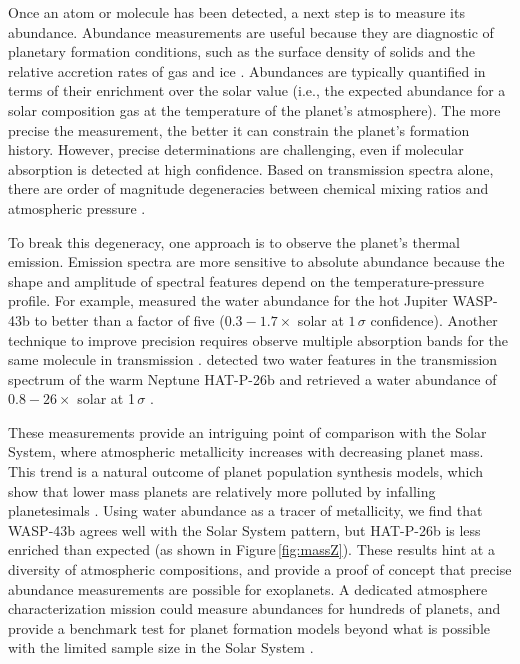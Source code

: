 \documentclass[graybox,natbib,nosecnum]{svmult}
\begin{document}
Once an atom or molecule has been detected, a next step is to measure its abundance. Abundance measurements are useful because they are diagnostic of planetary formation conditions, such as the surface density of solids and the relative accretion rates of gas and ice \citep[e.g.][]{fortney13, mordasini16}. Abundances are typically quantified in terms of their enrichment over the solar value (i.e., the expected abundance for a solar composition gas at the temperature of the planet's atmosphere).  The more precise the measurement, the better it can constrain the planet's formation history. However, precise determinations are challenging, even if molecular absorption is detected at high confidence.  Based on transmission spectra alone, there are order of magnitude degeneracies between chemical mixing ratios and atmospheric pressure \citep{benneke12, griffith13}.  

To break this degeneracy, one approach is to observe the planet's thermal emission.  Emission spectra are more sensitive to absolute abundance because the shape and amplitude of spectral features depend on the temperature-pressure profile. For example, \cite{stevenson17} measured the water abundance for the hot Jupiter WASP-43b to better than a factor of five  ($0.3 - 1.7\times$ solar at $1\,\sigma$ confidence). Another technique to improve precision requires observe multiple absorption bands for the same molecule in transmission \citep{benneke12}.  \cite{wakeford17} detected two water features in the transmission spectrum of the warm Neptune HAT-P-26b and retrieved a water abundance of $0.8 - 26\times$ solar at 1\,$\sigma$ \citep{wakeford17}.

These measurements provide an intriguing point of comparison with the Solar System, where atmospheric metallicity increases with decreasing planet mass. This trend is a natural outcome of planet population synthesis models, which show that lower mass planets are relatively more polluted by infalling planetesimals \citep{fortney13, mordasini16}. Using water abundance as a tracer of metallicity, we find that WASP-43b agrees well with the Solar System pattern, but HAT-P-26b is less enriched than expected (as shown in Figure\,\ref{fig:massZ}). These results hint at a diversity of atmospheric compositions, and provide a proof of concept that precise abundance measurements are possible for exoplanets. A dedicated atmosphere characterization mission could measure abundances for hundreds of planets, and provide a benchmark test for planet formation models beyond what is possible with the limited sample size in the Solar System \citep{chapman17}. 
 
\end{document}
